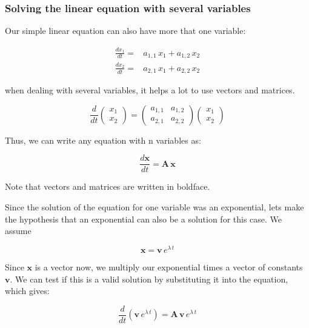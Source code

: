 \documentclass[12pt]{article}
\begin{document}
\subsubsection{Solving the linear equation with several variables}


Our simple linear equation can also have more that one variable:

\begin{align}
	\label{odenvar}
	\frac{dx_1}{dt} =& a_{1,1} \, x_1 + a_{1,2} \, x_2 \nonumber\\
	\frac{dx_2}{dt} =& a_{2,1} \, x_1 + a_{2,2} \, x_2
\end{align}

when dealing with several variables, it helps a lot to use vectors and matrices.

\begin{equation}
	\frac{d}{dt} \begin{pmatrix} x_1\\ x_2 \end{pmatrix} = \begin{pmatrix} a_{1,1} & a_{1,2}\\ a_{2,1} & a_{2,2} \end{pmatrix} \begin{pmatrix} x_1\\ x_2 \end{pmatrix} \nonumber
\end{equation}

Thus, we can write any equation with n variables as:

\begin{equation}
	\label{odenvar_mat}
	\frac{d\mathbf{x}}{dt}  = \mathbf{A} \, \mathbf{x}
\end{equation}

Note that vectors and matrices are written in boldface.

Since the solution of the equation for one variable was an exponential, lets make the hypothesis that an exponential can also be a solution for this case. We assume

\begin{equation}
	\mathbf{x}= \mathbf{v} \, e^{\lambda \, t} \nonumber
\end{equation}

Since $\mathbf{x}$ is a vector now, we multiply our exponential times a  vector of constants $\mathbf{v}$. We can test if this is a valid solution by substituting it into the equation, which gives:

\begin{equation}
	\frac{d}{dt} \left( \mathbf{v} \, e^{\lambda \, t} \right)  = \mathbf{A} \, \mathbf{v} \, e^{\lambda \, t}  \nonumber
\end{equation}
\end{document}
